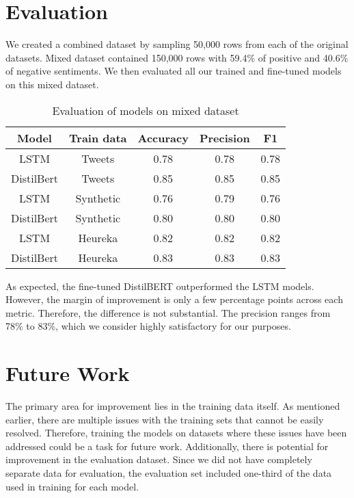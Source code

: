 \documentclass[11pt]{article}
\begin{document}
\section{Evaluation}
We created a combined dataset by sampling 50,000 rows from each of the original datasets. Mixed dataset contained 150,000 rows with 59.4\% of positive and 40.6\% of negative sentiments. We then evaluated all our trained and fine-tuned models on this mixed dataset.

\begin{table}[h!]
    \centering
    \begin{tabular}{|c|c|c|c|c|} 
        \hline
        \textbf{Model} & \textbf{Train data} & \textbf{Accuracy} & \textbf{Precision} & \textbf{F1} \\
        \hline
        LSTM & Tweets & 0.78 & 0.78 & 0.78 \\
        \hline 
        DistilBert & Tweets & 0.85 & 0.85 & 0.85 \\
        \hline
        LSTM & Synthetic & 0.76 & 0.79 & 0.76 \\
        \hline
        DistilBert & Synthetic & 0.80 & 0.80 & 0.80 \\
        \hline
        LSTM & Heureka & 0.82 & 0.82 & 0.82 \\
        \hline
        DistilBert & Heureka & 0.83 & 0.83 & 0.83 \\
        \hline
    \end{tabular}
    \caption{Evaluation of models on mixed dataset}
    \label{tab:model_eval}
\end{table}

As expected, the fine-tuned DistilBERT outperformed the LSTM models. However, the margin of improvement is only a few percentage points across each metric. Therefore, the difference is not substantial. The precision ranges from 78\% to 83\%, which we consider highly satisfactory for our purposes.

\section{Future Work}
The primary area for improvement lies in the training data itself. As mentioned earlier, there are multiple issues with the training sets that cannot be easily resolved. Therefore, training the models on datasets where these issues have been addressed could be a task for future work. Additionally, there is potential for improvement in the evaluation dataset. Since we did not have completely separate data for evaluation, the evaluation set included one-third of the data used in training for each model.
    
\end{document}
